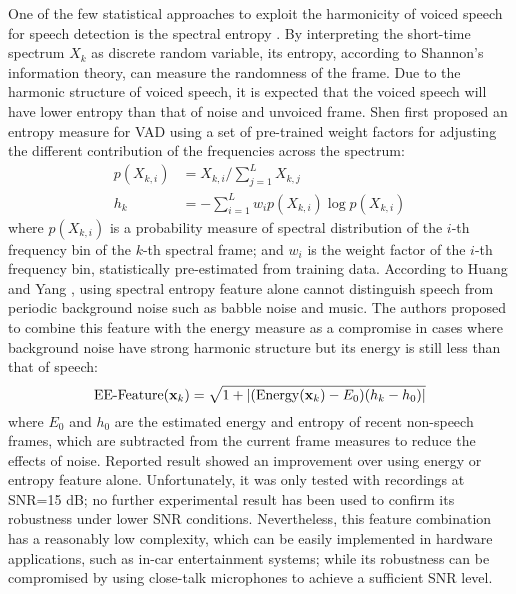 One of the few statistical approaches to exploit the harmonicity of voiced speech for speech detection is the spectral entropy \cite{krishnamachari2000spectral,shen1998robust,huang2000novel,basu2003linked}.
By interpreting the short-time spectrum $X_k$ as discrete random variable, its entropy, according to Shannon's information theory, can measure the randomness of the frame.
Due to the harmonic structure of voiced speech, it is expected that the voiced speech will have lower entropy than that of noise and unvoiced frame.
Shen \etal \cite{shen1998robust} first proposed an entropy measure for VAD using a set of pre-trained weight factors for adjusting the different contribution of the frequencies across the spectrum:
\begin{align}
    p(X_{k,i}) &= X_{k,i} / \sum_{j=1}^L X_{k,j} \\
    h_k &= - \sum_{i=1}^L w_i p(X_{k,i}) \log p(X_{k,i})
\end{align}
where $p(X_{k,i})$ is a probability measure of spectral distribution of the $i$-th frequency bin of the $k$-th spectral frame; and $w_i$ is the weight factor of the $i$-th frequency bin, statistically pre-estimated from training data.
According to Huang and Yang \cite{huang2000novel}, using spectral entropy feature alone cannot distinguish speech from periodic background noise such as babble noise and music.
The authors proposed to combine this feature with the energy measure as a compromise in cases where background noise have strong harmonic structure but its energy is still less than that of speech:
\begin{equation}
    \operatorname*{EE-Feature}(\mathbf{x}_k) = \sqrt{1+ \left|(\operatorname*{Energy}(\mathbf{x}_k) - E_0)(h_k - h_0) \right|}
\end{equation}
where $E_0$ and $h_0$ are the estimated energy and entropy of recent non-speech frames, which are subtracted from the current frame measures to reduce the effects of noise.
Reported result showed an improvement over using energy or entropy feature alone.
Unfortunately, it was only tested with recordings at SNR=15 dB; no further experimental result has been used to confirm its robustness under lower SNR conditions.
Nevertheless, this feature combination has a reasonably low complexity, which can be easily implemented in hardware applications, such as in-car entertainment systems; while its robustness can be compromised by using close-talk microphones to achieve a sufficient SNR level.



